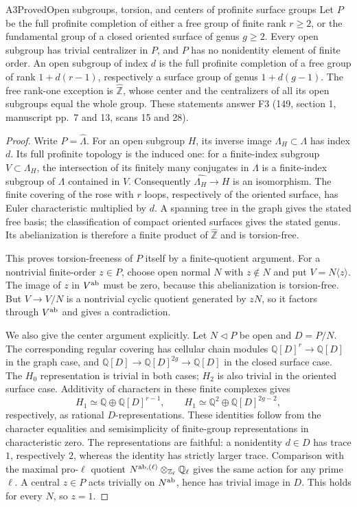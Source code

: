\begin{result}{A3}{Proved}{Open subgroups, torsion, and centers of profinite surface groups}
\label{res:A3}
Let $P$ be the full profinite completion of either a free group of finite
rank $r\geq2$, or the fundamental group of a closed oriented surface of
genus $g\geq2$. Every open subgroup has trivial centralizer in $P$, and
$P$ has no nonidentity element of finite order. An open subgroup of index
$d$ is the full profinite completion of a free group of rank
$1+d(r-1)$, respectively a surface group of genus $1+d(g-1)$.
The free rank-one exception is $\widehat{\mathbb Z}$, whose center and the
centralizers of all its open subgroups equal the whole group.
These statements answer F3 (149, section 1, manuscript pp.~7 and 13,
scans 15 and 28).
\end{result}
\begin{proof}
Write $P=\widehat\Lambda$. For an open subgroup $H$, its inverse image
$\Lambda_H\subset\Lambda$ has index $d$. Its full profinite topology is
the induced one: for a finite-index subgroup $V\subset\Lambda_H$, the
intersection of its finitely many conjugates in $\Lambda$ is a finite-index
subgroup of $\Lambda$ contained in $V$. Consequently
$\widehat{\Lambda_H}\to H$ is an isomorphism. The finite covering of the
rose with $r$ loops, respectively of the oriented surface, has Euler
characteristic multiplied by $d$. A spanning tree in the graph gives the
stated free basis; the classification of compact oriented surfaces gives
the stated genus. Its abelianization is therefore a finite product of
$\widehat{\mathbb Z}$ and is torsion-free.

This proves torsion-freeness of $P$ itself by a finite-quotient argument.
For a nontrivial finite-order $z\in P$, choose open normal $N$ with
$z\notin N$ and put $V=N\langle z\rangle$. The image of $z$ in
$V^{\rm ab}$ must be zero, because this abelianization is torsion-free.
But $V\to V/N$ is a nontrivial cyclic quotient generated by $zN$, so it
factors through $V^{\rm ab}$ and gives a contradiction.

We also give the center argument explicitly. Let $N\triangleleft P$ be
open and $D=P/N$. The corresponding regular covering has cellular chain
modules $\mathbb Q[D]^r\to\mathbb Q[D]$ in the graph case, and
$\mathbb Q[D]\to\mathbb Q[D]^{2g}\to\mathbb Q[D]$ in the closed surface
case. The $H_0$ representation is trivial in both cases; $H_2$ is also
trivial in the oriented surface case. Additivity of characters in these
finite complexes gives
\[
 H_1\simeq\mathbb Q\oplus\mathbb Q[D]^{r-1},\qquad
 H_1\simeq\mathbb Q^2\oplus\mathbb Q[D]^{2g-2},
\]
respectively, as rational $D$-representations. These identities follow
from the character equalities and semisimplicity of finite-group
representations in characteristic zero. The representations are faithful:
a nonidentity $d\in D$ has trace $1$, respectively $2$, whereas the
identity has strictly larger trace. Comparison with the maximal pro-$\ell$ quotient
$N^{\rm ab,(\ell)}\otimes_{\mathbb Z_\ell}\mathbb Q_\ell$ gives the same action for any prime
$\ell$. A central $z\in P$ acts trivially on $N^{\rm ab}$, hence has
trivial image in $D$. This holds for every $N$, so $z=1$.


\end{proof}
